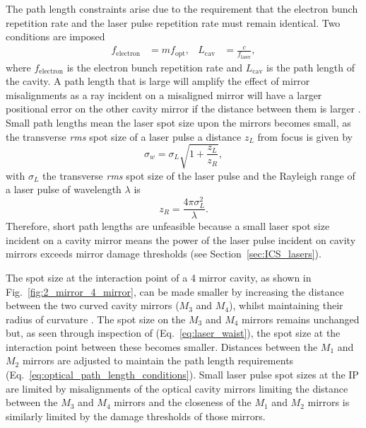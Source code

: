 \documentclass[../main.tex]{subfiles}
\begin{document}
The path length constraints arise due to the requirement that the electron bunch repetition rate and the laser pulse repetition rate must remain identical. Two conditions are imposed
\begin{align}
f_{\mathrm{electron}} &= mf_{\mathrm{opt}}, & L_{\mathrm{cav}} &= \frac{c}{f_{\mathrm{laser}}},
\label{eq:optical_path_length_conditions}    
\end{align}
where $f_{\mathrm{electron}}$ is the electron bunch repetition rate and $L_{\mathrm{cav}}$ is the path length of the cavity. A path length that is large will amplify the effect of mirror misalignments as a ray incident on a misaligned mirror will have a larger positional error on the other cavity mirror if the distance between them is larger \cite{zomer2009polarization}. Small path lengths mean the laser spot size upon the mirrors becomes small, as the transverse \textit{rms} spot size of a laser pulse a distance $z_{L}$ from focus is given by \cite{siegmann1986lasers}
\begin{equation}
\sigma_{w} = \sigma_{L}\sqrt{1+\frac{z_{L}}{z_{R}}},
\label{eq:laser_waist}    
\end{equation}
with $\sigma_{L}$ the transverse \textit{rms} spot size of the laser pulse and the Rayleigh range \cite{siegmann1986lasers} of a laser pulse of wavelength $\lambda$ is
\begin{equation}
z_{R} = \frac{4\pi\sigma_{L}^{2}}{\lambda}.
\label{eq:rayleigh_range}    
\end{equation}
Therefore, short path lengths are unfeasible because a small laser spot size incident on a cavity mirror means the power of the laser pulse incident on cavity mirrors exceeds mirror damage thresholds (see Section~\ref{sec:ICS_lasers}).

The spot size at the interaction point of a 4 mirror cavity, as shown in Fig.~\ref{fig:2_mirror_4_mirror}, can be made smaller by increasing the distance between the two curved cavity mirrors ($M_{3}$ and $M_{4}$), whilst maintaining their radius of curvature \cite{zomer2009polarization, akagi2016narrow}. The spot size on the $M_{3}$ and $M_{4}$ mirrors remains unchanged but, as seen through inspection of (Eq.~\ref{eq:laser_waist}), the spot size at the interaction point between these becomes smaller. Distances between the $M_{1}$ and $M_{2}$ mirrors are adjusted to maintain the path length requirements (Eq.~\ref{eq:optical_path_length_conditions}). Small laser pulse spot sizes at the IP are limited by misalignments of the optical cavity mirrors limiting the distance between the $M_{3}$ and $M_{4}$ mirrors and the closeness of the $M_{1}$ and $M_{2}$ mirrors is similarly limited by the damage thresholds of those mirrors.
\end{document}

